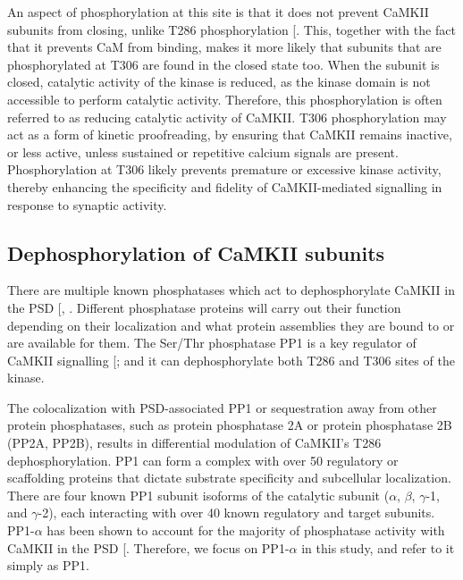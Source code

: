 \documentclass[
  11pt,
  letterpaper,
]{scrreprt}
\begin{document}
An aspect of phosphorylation at this site is that it does not prevent
CaMKII subunits from closing, unlike T286 phosphorylation
{[}\citeproc{ref-cook2021CaMKIIb}{198}{]}. This, together with the fact
that it prevents CaM from binding, makes it more likely that subunits
that are phosphorylated at T306 are found in the closed state too. When
the subunit is closed, catalytic activity of the kinase is reduced, as
the kinase domain is not accessible to perform catalytic activity.
Therefore, this phosphorylation is often referred to as reducing
catalytic activity of CaMKII. T306 phosphorylation may act as a form of
kinetic proofreading, by ensuring that CaMKII remains inactive, or less
active, unless sustained or repetitive calcium signals are present.
Phosphorylation at T306 likely prevents premature or excessive kinase
activity, thereby enhancing the specificity and fidelity of
CaMKII-mediated signalling in response to synaptic activity.

\subsection{Dephosphorylation of CaMKII
subunits}\label{dephosphorylation-of-camkii-subunits}

There are multiple known phosphatases which act to dephosphorylate
CaMKII in the PSD {[},
\citeproc{ref-cohen1997Novel}{469}{]}. Different phosphatase proteins
will carry out their function depending on their localization and what
protein assemblies they are bound to or are available for them. The
Ser/Thr phosphatase PP1 is a key regulator of CaMKII signalling
{[}\citeproc{ref-shioda2017Physiological}{470}{]}; and it can
dephosphorylate both T286 and T306 sites of the kinase.

The colocalization with PSD-associated PP1 or sequestration away from
other protein phosphatases, such as protein phosphatase 2A or protein
phosphatase 2B (PP2A, PP2B), results in differential modulation of
CaMKII's T286 dephosphorylation. PP1 can form a complex with over 50
regulatory or scaffolding proteins that dictate substrate specificity
and subcellular localization. There are four known PP1 subunit isoforms
of the catalytic subunit (\(\alpha\), \(\beta\), \(\gamma\)-1, and
\(\gamma\)-2), each interacting with over 40 known regulatory and target
subunits. PP1-\(\alpha\) has been shown to account for the majority of
phosphatase activity with CaMKII in the PSD
{[}\citeproc{ref-colbran2004Protein}{147}{]}. Therefore, we focus on
PP1-\(\alpha\) in this study, and refer to it simply as PP1.
\end{document}
